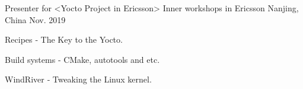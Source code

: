 

\begin{cventries}

  \cventry
    {Presenter for <Yocto Project in Ericsson>} %
    {Inner workshops in Ericsson} %
    {Nanjing, China} %
    {Nov. 2019} %
    {
      \begin{cvitems} %
        \item {Recipes ‐ The Key to the Yocto.}
        \item {Build systems ‐ CMake, autotools and etc.}
        \item {WindRiver ‐ Tweaking the Linux kernel.}
      \end{cvitems}
    }

\end{cventries}
